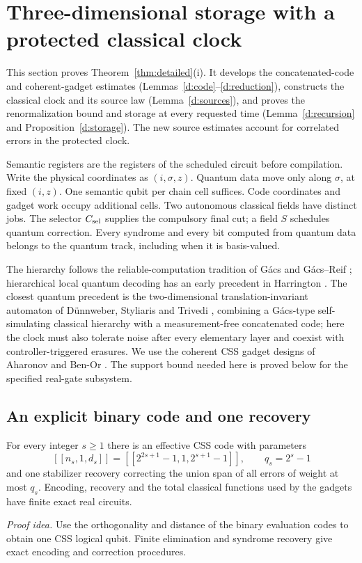 \section{Three-dimensional storage with a protected classical clock}\label{sec:quantum}

This section proves Theorem~\ref{thm:detailed}(i). It develops the concatenated-code and coherent-gadget estimates (Lemmas~\ref{d:code}--\ref{d:reduction}), constructs the classical clock and its source law (Lemma~\ref{d:sources}), and proves the renormalization bound and storage at every requested time (Lemma~\ref{d:recursion} and Proposition~\ref{d:storage}). The new source estimates account for correlated errors in the protected clock.

Semantic registers are the registers of the scheduled circuit before
compilation. Write the physical coordinates as \((i,\sigma,z)\).
Quantum data move only along \(\sigma\), at fixed \((i,z)\). One semantic qubit per chain cell suffices. Code coordinates and gadget work occupy additional cells. Two autonomous classical fields have
distinct jobs. The selector
\(C_{\rm sel}\) supplies the compulsory final cut; a field \(S\)
schedules quantum correction. Every syndrome and every bit computed
from quantum data belongs to the quantum track, including when it is
basis-valued.

The hierarchy follows the reliable-computation tradition of G\'acs
and G\'acs--Reif \cite{Gacs2001,GacsReif1988}; hierarchical local quantum
decoding has an early precedent in Harrington \cite{Harrington2004}.
The closest quantum precedent is the two-dimensional translation-invariant automaton of D\"unnweber, Styliaris and Trivedi \cite{DST2026}, combining a G\'acs-type self-simulating classical hierarchy with a measurement-free concatenated code; here the clock must also tolerate noise after every elementary layer and coexist with controller-triggered erasures.
We use the coherent CSS gadget designs of Aharonov and Ben-Or
\cite{ABO2008}. The support bound needed here is proved below
for the specified real-gate subsystem.

\subsection{An explicit binary code and one recovery}

\begin{lemma}\label{d:code}
For every integer \(s\ge1\) there is an effective CSS code with parameters
\[
 [[n_s,1,d_s]]=[[2^{2s+1}-1,1,2^{s+1}-1]],
 \qquad q_s=2^s-1
\]
and one stabilizer recovery correcting the union span of all errors of
weight at most \(q_s\). Encoding, recovery and the total classical
functions used by the gadgets have finite exact real circuits.
\end{lemma}
\par\noindent\emph{Proof idea.} Use the orthogonality and distance of the binary evaluation codes to obtain one CSS logical qubit. Finite elimination and syndrome recovery give exact encoding and correction procedures.

